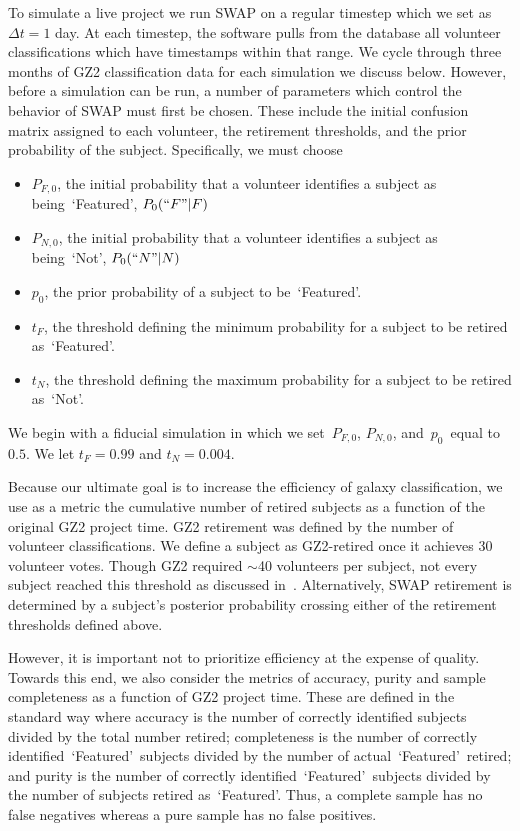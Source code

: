 \documentclass[twocolumn]{aastex6}
\newcommand{\Pf}{$P_{F,0}$}
\newcommand{\Pn}{$P_{N,0}$}
\newcommand{\p}{$p_0$}
\newcommand{\tf}{$t_F$}
\newcommand{\tn}{$t_N$}
\newcommand{\feat}{`Featured'}
\newcommand{\notfeat}{`Not'}
\begin{document}
To simulate a live project we run SWAP on a regular timestep which we set as $\Delta t = 1$ day. 
At each timestep, the software pulls from the database all volunteer classifications which
have timestamps within that range. We cycle through three months of GZ2 classification data 
for each simulation we discuss below. However, before a simulation can be run, a number 
of parameters which control the behavior of SWAP must first be chosen. These include
 the initial confusion matrix assigned to each volunteer, the retirement
thresholds, and the prior probability of the subject. Specifically, we must choose 
\begin{itemize}
\item \Pf, the initial probability that a volunteer identifies a subject as being~\feat, $P_0(``F"|F)$
\item \Pn, the initial probability that a volunteer identifies a subject as being~\notfeat, $P_0(``N"|N)$
\item \p, the prior probability of a subject to be~\feat.
\item \tf, the threshold defining the minimum probability for a subject to be retired as~\feat.
\item \tn, the threshold defining the maximum probability for a subject to be retired as~\notfeat.
\end{itemize}


We begin with a fiducial simulation in which we set~\Pf, \Pn, and~\p~equal to $0.5$.
We let $t_F = 0.99$ and $t_N = 0.004$. 

Because our ultimate goal is to increase the efficiency of galaxy classification,
we use as a metric the cumulative number of retired subjects
as a function of the original GZ2 project time.
GZ2 retirement was defined by the number of volunteer classifications.  
We define a subject as GZ2-retired once it achieves 30 volunteer votes. 
Though GZ2 required $\sim$40 volunteers per subject, not every subject reached this
threshold  as discussed in~\cite{Willett2013}. 
Alternatively, SWAP retirement is determined by a subject's posterior 
probability crossing either of the retirement thresholds defined above. 

However, it is important not to prioritize efficiency at the expense of quality. 
Towards this end, we also consider the metrics of accuracy, 
purity and sample completeness as a function of GZ2 project time.  These are 
defined in the standard way where accuracy is the number of correctly
identified subjects divided by the total number retired; completeness is the number of 
correctly identified~\feat~subjects divided by the number of actual~\feat~retired; 
and purity is the number of correctly identified~\feat~subjects divided by 
the number of subjects retired as~\feat. Thus, a complete sample has no false
negatives whereas a pure sample has no false positives. 
\end{document}
